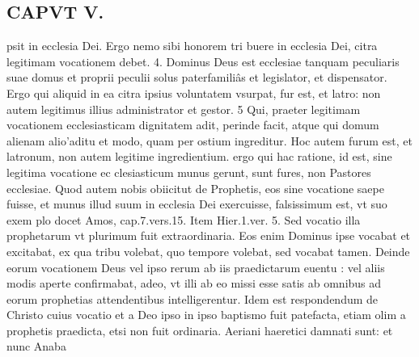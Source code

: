 \documentclass{article}
\begin{document}
\begin{pages}
\section*{CAPVT V. }
\marginpar{[ p.343 ]}\pstart psit in ecclesia Dei. Ergo nemo sibi honorem tri buere in ecclesia Dei, citra legitimam vocationem debet. 4. Dominus Deus est ecclesiae tanquam peculiaris suae domus et proprii peculii solus paterfamiliâs et legislator, et dispensator. Ergo qui aliquid in ea citra ipsius voluntatem vsurpat, fur est, et latro: non autem legitimus illius administrator et gestor. 5 Qui, praeter legitimam vocationem ecclesiasticam dignitatem adit, perinde facit, atque qui domum alienam alio’aditu et modo, quam per ostium ingreditur. Hoc autem furum est, et latronum, non autem legitime ingredientium. ergo qui hac ratione, id est, sine legitima vocatione ec clesiasticum munus gerunt, sunt fures, non Pastores ecclesiae. Quod autem nobis obiicitut de Prophetis, eos sine vocatione saepe fuisse, et munus illud suum in ecclesia Dei exercuisse, falsissimum est, vt suo exem plo docet Amos, cap.7.vers.15. Item Hier.1.ver. 5. Sed vocatio illa prophetarum vt plurimum fuit extraordinaria. Eos enim Dominus ipse vocabat et excitabat, ex qua tribu volebat, quo tempore volebat, sed vocabat tamen. Deinde eorum vocationem Deus vel ipso rerum ab iis praedictarum euentu : vel aliis modis aperte confirmabat, adeo, vt illi ab eo missi esse satis ab omnibus ad eorum prophetias attendentibus intelligerentur. Idem est respondendum de Christo cuius vocatio et a Deo ipso in ipso baptismo fuit patefacta, etiam olim a prophetis praedicta, etsi non fuit ordinaria. Aeriani haeretici damnati sunt: et nunc Anaba\pend

\end{pages}
\end{document}
